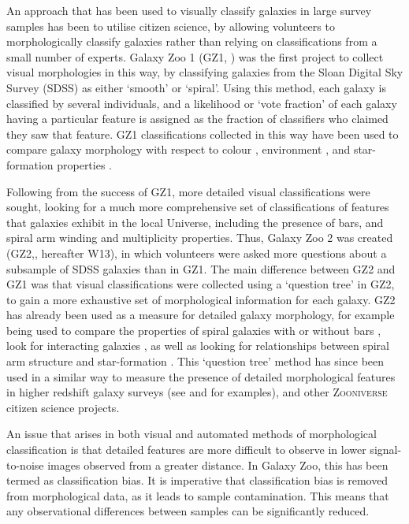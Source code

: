 \documentclass[useAMS,usenatbib]{mn2e}
\begin{document}
An approach that has been used to visually classify galaxies in large survey samples has been to utilise citizen science, by allowing volunteers to morphologically classify galaxies rather than relying on classifications from a small number of experts. Galaxy Zoo 1 (GZ1, \citet{Lintott_08,Lintott_11}) was the first project to collect visual morphologies in this way, by classifying galaxies from the Sloan Digital Sky Survey (SDSS) as either `smooth' or `spiral'. Using this method, each galaxy is classified by several individuals, and a likelihood or `vote fraction' of each galaxy having a particular feature is assigned as the fraction of classifiers who claimed they saw that feature. GZ1 classifications collected in this way have been used to compare galaxy morphology with respect to colour \citep{Masters_10a,Masters_10b,Bamford_09}, environment \citep{Skibba_09,Bamford_09}, and star-formation properties \citep{Tojeiro_13,Schawinski_14,Smethurst_15}. 

Following from the success of GZ1, more detailed visual classifications were sought, looking for a much more comprehensive set of classifications of features that galaxies exhibit in the local Universe, including the presence of bars, and spiral arm winding and multiplicity properties. Thus, Galaxy Zoo 2 was created (GZ2,\citet{Willett_13}, hereafter W13), in which volunteers were asked more questions about a subsample of SDSS galaxies than in GZ1. The main difference between GZ2 and GZ1 was that visual classifications were collected using a `question tree' in GZ2, to gain a more exhaustive set of morphological information for each galaxy. GZ2 has already been used as a measure for detailed galaxy morphology, for example being used to compare the properties of spiral galaxies with or without bars \citep{Masters_11,Masters_12,Cheung_13}, look for interacting galaxies \citep{Casteels_13}, as well as looking for relationships between spiral arm structure and star-formation \citep{Willett_15}. This `question tree' method has since been used in a similar way to measure the presence of detailed morphological features in higher redshift galaxy surveys (see \citet{Melvin_14} and \citet{Simmons_14} for examples), and other \textsc{Zooniverse} citizen science projects. 

An issue that arises in both visual and automated methods of morphological classification is that detailed features are more difficult to observe in lower signal-to-noise images observed from a greater distance. In Galaxy Zoo, this has been termed as classification bias. It is imperative that classification bias is removed from morphological data, as it leads to sample contamination. This means that any observational differences between samples can be significantly reduced.
\end{document}
